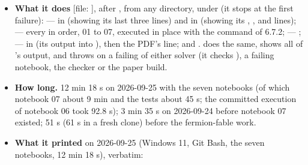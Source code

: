 \begin{itemize}
  \item \textbf{What it does} [file: ], after , from any directory, under  (it stops at the first failure):  ---  in  (showing its last three lines) and in  (showing its , ,  and  lines);  --- every  in order, 01 to 07, executed in place with the  command of 6.7.2;  --- ;  ---  in  (its output into ), then the PDF's  line; and .  does the same, shows all of 's output, and throws on a failing  of either solver (it checks ), a failing notebook, the checker or the paper build.
  \item \textbf{How long.} 12 min 18 s on 2026-09-25 with the seven notebooks (of which notebook 07 about 9 min and the  tests about 45 s; the committed execution of notebook 06 took 92.8 s); 3 min 35 s on 2026-09-24 before notebook 07 existed; 51 s (61 s in a fresh clone) before the fermion-fable work.
  \item \textbf{What it printed} on 2026-09-25 (Windows 11, Git Bash, the seven notebooks, 12 min 18 s), verbatim:
\end{itemize}

